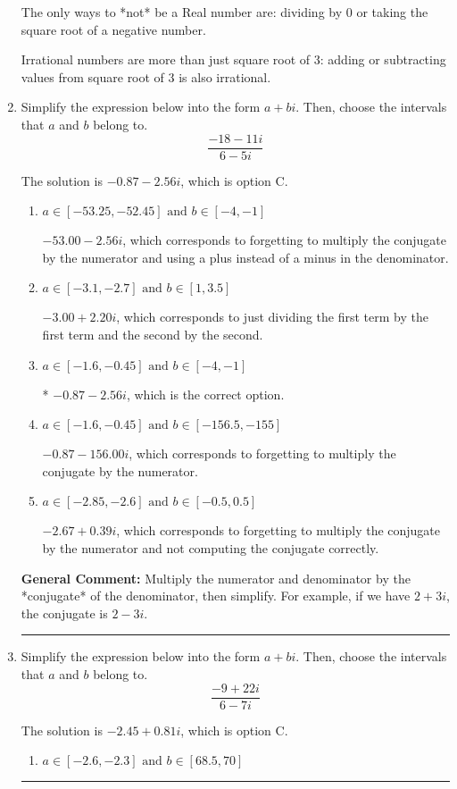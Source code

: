\documentclass{extbook}[14pt]
\newcommand{\litem}[1]{\item #1

\rule{\textwidth}{0.4pt}}
\begin{document}
\begin{enumerate}
{ The only ways to *not* be a Real number are: dividing by 0 or taking the square root of a negative number. 
 
 Irrational numbers are more than just square root of 3: adding or subtracting values from square root of 3 is also irrational.
}
\litem{
Simplify the expression below into the form $a+bi$. Then, choose the intervals that $a$ and $b$ belong to.
\[ \frac{-18 - 11 i}{6 - 5 i} \]

The solution is \( -0.87  - 2.56 i \), which is option C.\begin{enumerate}[label=\Alph*.]
\item \( a \in [-53.25, -52.45] \text{ and } b \in [-4, -1] \)

 $-53.00  - 2.56 i$, which corresponds to forgetting to multiply the conjugate by the numerator and using a plus instead of a minus in the denominator.
\item \( a \in [-3.1, -2.7] \text{ and } b \in [1, 3.5] \)

 $-3.00  + 2.20 i$, which corresponds to just dividing the first term by the first term and the second by the second.
\item \( a \in [-1.6, -0.45] \text{ and } b \in [-4, -1] \)

* $-0.87  - 2.56 i$, which is the correct option.
\item \( a \in [-1.6, -0.45] \text{ and } b \in [-156.5, -155] \)

 $-0.87  - 156.00 i$, which corresponds to forgetting to multiply the conjugate by the numerator.
\item \( a \in [-2.85, -2.6] \text{ and } b \in [-0.5, 0.5] \)

 $-2.67  + 0.39 i$, which corresponds to forgetting to multiply the conjugate by the numerator and not computing the conjugate correctly.
\end{enumerate}

\textbf{General Comment:} Multiply the numerator and denominator by the *conjugate* of the denominator, then simplify. For example, if we have $2+3i$, the conjugate is $2-3i$.
}
\litem{
Simplify the expression below into the form $a+bi$. Then, choose the intervals that $a$ and $b$ belong to.
\[ \frac{-9 + 22 i}{6 - 7 i} \]

The solution is \( -2.45  + 0.81 i \), which is option C.\begin{enumerate}[label=\Alph*.]
\item \( a \in [-2.6, -2.3] \text{ and } b \in [68.5, 70] \)


\end{enumerate}}
\end{enumerate}
\end{document}
